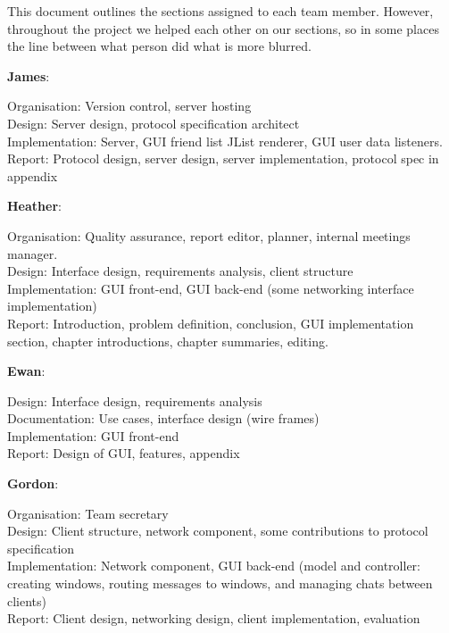 \label{sumlog}

This document outlines the sections assigned to each team member. However, throughout the project we helped each other on our sections, so in some places the line between what person did what is more blurred.

{\bf James}:

Organisation: Version control, server hosting\\
Design: Server design, protocol specification architect\\
Implementation: Server, GUI friend list JList renderer, GUI user data listeners.\\
Report: Protocol design, server design, server implementation, protocol spec in appendix

{\bf Heather}:

Organisation: Quality assurance, report editor, planner, internal meetings manager.\\
Design: Interface design, requirements analysis, client structure\\
Implementation: GUI front-end, GUI back-end (some networking interface implementation)\\
Report: Introduction, problem definition, conclusion, GUI implementation section, chapter introductions, chapter summaries, editing. 

{\bf Ewan}:

Design: Interface design, requirements analysis\\
Documentation: Use cases, interface design (wire frames)\\
Implementation: GUI front-end\\
Report: Design of GUI, features, appendix

{\bf Gordon}:

Organisation: Team secretary\\
Design: Client structure, network component, some contributions to protocol specification\\
Implementation: Network component, GUI back-end (model and controller: creating windows, routing messages to windows, and managing chats between clients)\\
Report: Client design, networking design, client implementation, evaluation
